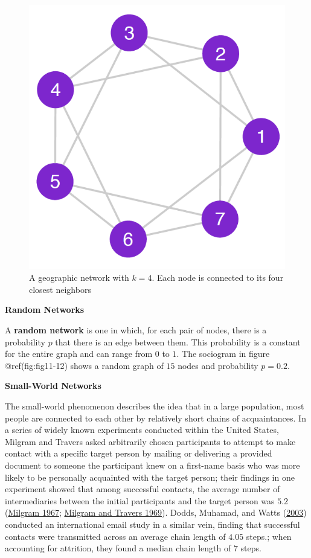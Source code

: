 \documentclass{book}
\begin{document}
\begin{figure}
\hypertarget{fig:fig11-11}{%
\centering
\includegraphics{images/social-networks/11-11.png}
\caption{A geographic network with \(k = 4\). Each node is connected to its
four closest neighbors}\label{fig:fig11-11}
}
\end{figure}

\textbf{Random Networks}

A \textbf{random network} is one in which, for each pair of nodes, there is a
probability \(p\) that there is an edge between them. This probability is a
constant for the entire graph and can range from \(0\) to \(1\). The sociogram
in figure @ref(fig:fig11-12) shows a random graph of \(15\) nodes and
probability \(p = 0.2\).

\textbf{Small-World Networks}

The small-world phenomenon describes the idea that in a large population, most
people are connected to each other by relatively short chains of
acquaintances. In a series of widely known experiments conducted within the
United States, Milgram and Travers asked arbitrarily chosen participants to
attempt to make contact with a specific target person by mailing or delivering
a provided document to someone the participant knew on a first-name basis who
was more likely to be personally acquainted with the target person; their
findings in one experiment showed that among successful contacts, the average
number of intermediaries between the initial participants and the target
person was \(5.2\) (\protect\hyperlink{ref-Milgram1967}{Milgram 1967};
\protect\hyperlink{ref-MilgramTravers1969}{Milgram and Travers 1969}). Dodds,
Muhamad, and Watts (\protect\hyperlink{ref-DoddsEtAl2003}{2003}) conducted an
international email study in a similar vein, finding that successful contacts
were transmitted across an average chain length of \(4.05\) steps.; when
accounting for attrition, they found a median chain length of \(7\) steps.
\end{document}

